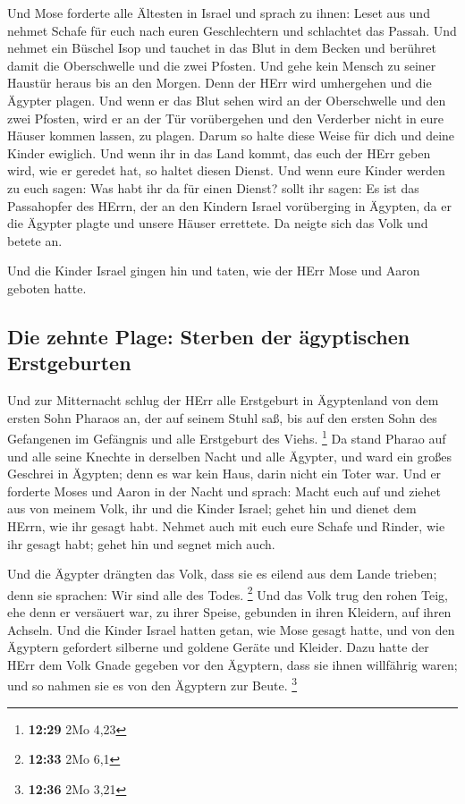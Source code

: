  Und Mose forderte alle Ältesten in Israel und sprach zu
ihnen: Leset aus und nehmet Schafe für euch nach euren Geschlechtern und
schlachtet das Passah.  Und nehmet ein Büschel Isop und
tauchet in das Blut in dem Becken und berühret damit die Oberschwelle
und die zwei Pfosten. Und gehe kein Mensch zu seiner Haustür heraus bis
an den Morgen.  Denn der HErr wird umhergehen und die
Ägypter plagen. Und wenn er das Blut sehen wird an der Oberschwelle und
den zwei Pfosten, wird er an der Tür vorübergehen und den Verderber
nicht in eure Häuser kommen lassen, zu plagen.  Darum so
halte diese Weise für dich und deine Kinder ewiglich. 
Und wenn ihr in das Land kommt, das euch der HErr geben wird, wie er
geredet hat, so haltet diesen Dienst.  Und wenn eure
Kinder werden zu euch sagen: Was habt ihr da für einen Dienst?
 sollt ihr sagen: Es ist das Passahopfer des HErrn, der
an den Kindern Israel vorüberging in Ägypten, da er die Ägypter plagte
und unsere Häuser errettete. Da neigte sich das Volk und betete an.

 Und die Kinder Israel gingen hin und taten, wie der HErr
Mose und Aaron geboten hatte.

\hypertarget{die-zehnte-plage-sterben-der-uxe4gyptischen-erstgeburten}{%
\subsection{Die zehnte Plage: Sterben der ägyptischen
Erstgeburten}\label{die-zehnte-plage-sterben-der-uxe4gyptischen-erstgeburten}}

 Und zur Mitternacht schlug der HErr alle Erstgeburt in
Ägyptenland von dem ersten Sohn Pharaos an, der auf seinem Stuhl saß,
bis auf den ersten Sohn des Gefangenen im Gefängnis und alle Erstgeburt
des Viehs. \footnote{\textbf{12:29} 2Mo 4,23}  Da stand
Pharao auf und alle seine Knechte in derselben Nacht und alle Ägypter,
und ward ein großes Geschrei in Ägypten; denn es war kein Haus, darin
nicht ein Toter war.  Und er forderte Moses und Aaron in
der Nacht und sprach: Macht euch auf und ziehet aus von meinem Volk, ihr
und die Kinder Israel; gehet hin und dienet dem HErrn, wie ihr gesagt
habt.  Nehmet auch mit euch eure Schafe und Rinder, wie
ihr gesagt habt; gehet hin und segnet mich auch.

 Und die Ägypter drängten das Volk, dass sie es eilend
aus dem Lande trieben; denn sie sprachen: Wir sind alle des Todes.
\footnote{\textbf{12:33} 2Mo 6,1}  Und das Volk trug den
rohen Teig, ehe denn er versäuert war, zu ihrer Speise, gebunden in
ihren Kleidern, auf ihren Achseln.  Und die Kinder Israel
hatten getan, wie Mose gesagt hatte, und von den Ägyptern gefordert
silberne und goldene Geräte und Kleider.  Dazu hatte der
HErr dem Volk Gnade gegeben vor den Ägyptern, dass sie ihnen willfährig
waren; und so nahmen sie es von den Ägyptern zur Beute. \footnote{\textbf{12:36}
  2Mo 3,21}


